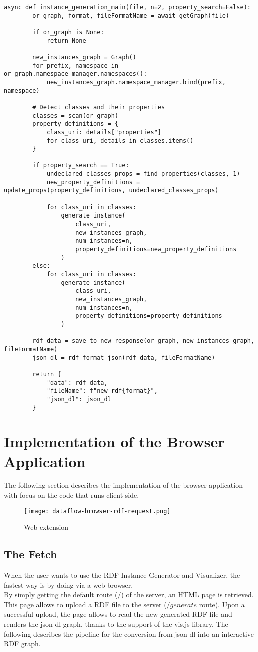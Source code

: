 \begin{lstlisting}[caption={Main Function for RDF Instance Generation}, label={lst:instance_generation_main}]
	async def instance_generation_main(file, n=2, property_search=False):
		or_graph, format, fileFormatName = await getGraph(file)
	
		if or_graph is None:
			return None
	
		new_instances_graph = Graph()
		for prefix, namespace in or_graph.namespace_manager.namespaces():
			new_instances_graph.namespace_manager.bind(prefix, namespace)
	
		# Detect classes and their properties
		classes = scan(or_graph)
		property_definitions = {
			class_uri: details["properties"]
			for class_uri, details in classes.items()
		}
	
		if property_search == True:
			undeclared_classes_props = find_properties(classes, 1)
			new_property_definitions = update_props(property_definitions, undeclared_classes_props)
	
			for class_uri in classes:
				generate_instance(
					class_uri,
					new_instances_graph,
					num_instances=n,
					property_definitions=new_property_definitions
				)
		else:
			for class_uri in classes:
				generate_instance(
					class_uri,
					new_instances_graph,
					num_instances=n,
					property_definitions=property_definitions
				)
	
		rdf_data = save_to_new_response(or_graph, new_instances_graph, fileFormatName)
		json_dl = rdf_format_json(rdf_data, fileFormatName)
	
		return {
			"data": rdf_data,
			"fileName": f"new_rdf{format}",
			"json_dl": json_dl
		}
	\end{lstlisting}


\section{Implementation of the Browser Application}

The following section describes the implementation of the browser application with focus on the code that runs client side. 

\begin{figure}[htb]
	\centering
	\texttt{[image: dataflow-browser-rdf-request.png]}
	\caption{Web extension}
	\label{fig:dataflow-browser-rdf-request}
  \end{figure}
\subsection{The Fetch}
When the user wants to use the RDF Instance Generator and Visualizer, the fastest way is by doing via a web browser. 
\\
By simply getting the default route ($/$) of the server, an HTML page is retrieved. This page allows to upload a RDF file to the server ($/generate$ route). 
Upon a successful upload, the page allows to read the new generated RDF file and renders the json-dl graph, thanks to the support of the vis.js library. 
The following describes the pipeline for the conversion from json-dl into an interactive RDF graph.

